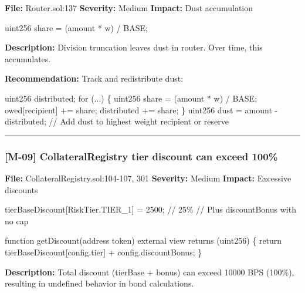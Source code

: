 \documentclass[
]{article}
\newenvironment{Shaded}{}{}
\newcommand{\NormalTok}[1]{#1}
\begin{document}
\textbf{File:} Router.sol:137 \textbf{Severity:} Medium \textbf{Impact:}
Dust accumulation

\begin{Shaded}
\begin{Highlighting}[]
\NormalTok{uint256 share = (amount * w) / BASE;}
\end{Highlighting}
\end{Shaded}

\textbf{Description:} Division truncation leaves dust in router. Over
time, this accumulates.

\textbf{Recommendation:} Track and redistribute dust:

\begin{Shaded}
\begin{Highlighting}[]
\NormalTok{uint256 distributed;}
\NormalTok{for (...) \{}
\NormalTok{    uint256 share = (amount * w) / BASE;}
\NormalTok{    owed[recipient] += share;}
\NormalTok{    distributed += share;}
\NormalTok{\}}
\NormalTok{uint256 dust = amount {-} distributed;}
\NormalTok{// Add dust to highest weight recipient or reserve}
\end{Highlighting}
\end{Shaded}

\begin{center}\rule{0.5\linewidth}{0.5pt}\end{center}

\subsubsection{{[}M-09{]} CollateralRegistry tier discount can exceed
100\%}\label{m-09-collateralregistry-tier-discount-can-exceed-100}

\textbf{File:} CollateralRegistry.sol:104-107, 301 \textbf{Severity:}
Medium \textbf{Impact:} Excessive discounts

\begin{Shaded}
\begin{Highlighting}[]
\NormalTok{tierBaseDiscount[RiskTier.TIER\_1] = 2500;  // 25\%}
\NormalTok{// Plus discountBonus with no cap}

\NormalTok{function getDiscount(address token) external view returns (uint256) \{}
\NormalTok{    return tierBaseDiscount[config.tier] + config.discountBonus;}
\NormalTok{\}}
\end{Highlighting}
\end{Shaded}

\textbf{Description:} Total discount (tierBase + bonus) can exceed 10000
BPS (100\%), resulting in undefined behavior in bond calculations.
\end{document}

